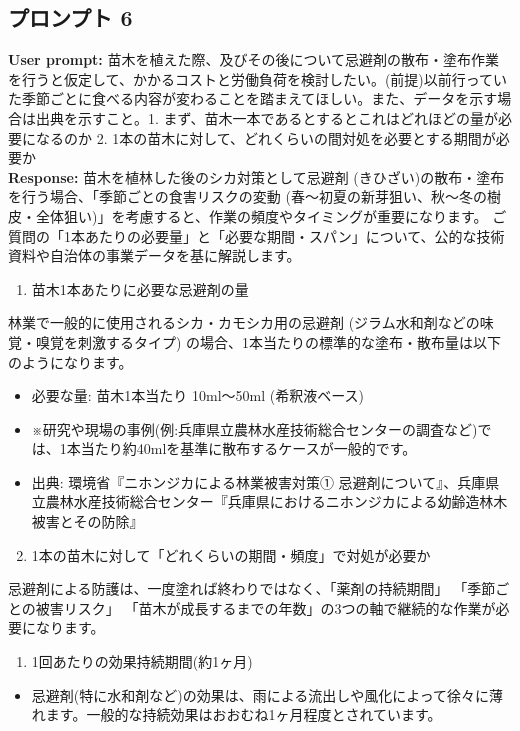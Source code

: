 \documentclass[a4paper, 11pt]{jsarticle}
\begin{document}
\subsection{プロンプト 6}
\noindent\textbf{User prompt:} 苗木を植えた際、及びその後について忌避剤の散布・塗布作業を行うと仮定して、かかるコストと労働負荷を検討したい。(前提)以前行っていた季節ごとに食べる内容が変わることを踏まえてほしい。また、データを示す場合は出典を示すこと。1. まず、苗木一本であるとするとこれはどれほどの量が必要になるのか 2. 1本の苗木に対して、どれくらいの間対処を必要とする期間が必要か \\
\noindent\textbf{Response:} 苗木を植林した後のシカ対策として忌避剤 (きひざい)の散布・塗布を行う場合、「季節ごとの食害リスクの変動 (春〜初夏の新芽狙い、秋〜冬の樹皮・全体狙い)」を考慮すると、作業の頻度やタイミングが重要になります。
ご質問の「1本あたりの必要量」と「必要な期間・スパン」について、公的な技術資料や自治体の事業データを基に解説します。
\begin{enumerate}
    \item 苗木1本あたりに必要な忌避剤の量
\end{enumerate}
林業で一般的に使用されるシカ・カモシカ用の忌避剤 (ジラム水和剤などの味覚・嗅覚を刺激するタイプ) の場合、1本当たりの標準的な塗布・散布量は以下のようになります。
\begin{itemize}
    \item 必要な量: 苗木1本当たり 10ml〜50ml (希釈液ベース)\cite{ref6,ref7}
    \item ※研究や現場の事例(例:兵庫県立農林水産技術総合センターの調査など)では、1本当たり約40mlを基準に散布するケースが一般的です\cite{ref7}。
    \item 出典: 環境省『ニホンジカによる林業被害対策① 忌避剤について』\cite{ref6}、兵庫県立農林水産技術総合センター『兵庫県におけるニホンジカによる幼齢造林木被害とその防除』\cite{ref7}
\end{itemize}
\begin{enumerate}
    \setcounter{enumi}{1}
    \item 1本の苗木に対して「どれくらいの期間・頻度」で対処が必要か
\end{enumerate}
忌避剤による防護は、一度塗れば終わりではなく、「薬剤の持続期間」 「季節ごとの被害リスク」 「苗木が成長するまでの年数」の3つの軸で継続的な作業が必要になります。
\begin{enumerate}
    \item[①] 1回あたりの効果持続期間(約1ヶ月)
\end{enumerate}
\begin{itemize}
    \item 忌避剤(特に水和剤など)の効果は、雨による流出しや風化によって徐々に薄れます。一般的な持続効果はおおむね1ヶ月程度とされています\cite{ref7}。
\end{itemize}
\end{document}
